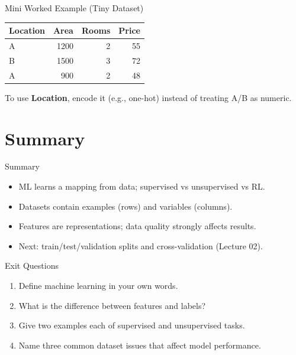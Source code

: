 \documentclass[aspectratio=169]{beamer}
\begin{document}
\begin{frame}{Mini Worked Example (Tiny Dataset)}
  \centering
  \begin{tabular}{lrrr}
    \toprule
    Location & Area & Rooms & Price \\
    \midrule
    A & 1200 & 2 & 55 \\
    B & 1500 & 3 & 72 \\
    A & 900  & 2 & 48 \\
    \bottomrule
  \end{tabular}
  \vspace{0.4em}
  \small To use \textbf{Location}, encode it (e.g., one-hot) instead of treating A/B as numeric.
\end{frame}

\section{Summary}
\label{sec:summary}

\begin{frame}{Summary}
  \begin{itemize}
    \item ML learns a mapping from data; supervised vs unsupervised vs RL.
    \item Datasets contain examples (rows) and variables (columns).
    \item Features are representations; data quality strongly affects results.
    \item Next: train/test/validation splits and cross-validation (Lecture 02).
  \end{itemize}
  \slidesources{\AIMLUnitIIISources}
\end{frame}

\begin{frame}{Exit Questions}
  \begin{enumerate}
    \item Define machine learning in your own words.
    \item What is the difference between features and labels?
    \item Give two examples each of supervised and unsupervised tasks.
    \item Name three common dataset issues that affect model performance.
  \end{enumerate}
\end{frame}
\end{document}
